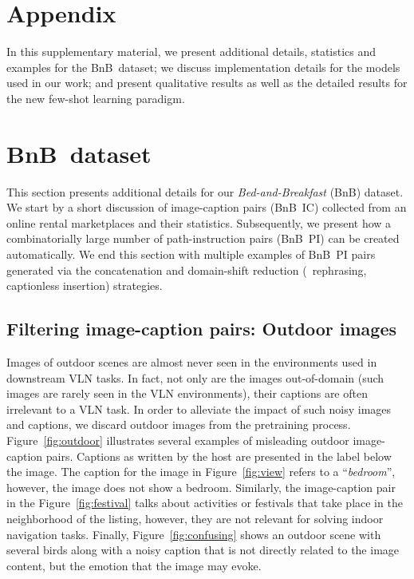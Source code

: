 \RequirePackage[dvipsnames,table]{xcolor} \documentclass[10pt,twocolumn,letterpaper]{article}
\newcommand{\airbnb}{BnB}
\begin{document}
\newpage
\appendix
\section*{Appendix}
In this supplementary material, we present additional details, statistics and examples for the \airbnb~dataset; we discuss implementation details for the models used in our work; and present qualitative results as well as the detailed results for the new few-shot learning paradigm.


\section{\airbnb~dataset}
\label{sec:supp-bnb}

This section presents additional details for our \emph{Bed-and-Breakfast} (BnB) dataset.
We start by a short discussion of image-caption pairs (\airbnb~IC) collected from an online rental marketplaces and their statistics.
Subsequently, we present how a combinatorially large number of path-instruction pairs (\airbnb~PI) can be created automatically.
We end this section with multiple examples of \airbnb~PI pairs generated via the concatenation and domain-shift reduction (\eg~rephrasing, captionless insertion) strategies.

\subsection{Filtering image-caption pairs: Outdoor images}
Images of outdoor scenes are almost never seen in the environments used in downstream VLN tasks.
In fact, not only are the images out-of-domain (such images are rarely seen in the VLN environments), their captions are often irrelevant to a VLN task.
In order to alleviate the impact of such noisy images and captions, we discard outdoor images from the pretraining process.
Figure~\ref{fig:outdoor} illustrates several examples of misleading outdoor image-caption pairs.
Captions as written by the host are presented in the label below the image.
The caption for the image in Figure~\ref{fig:view} refers to a ``\emph{bedroom}'', however, the image does not show a bedroom.
Similarly, the image-caption pair in the Figure~\ref{fig:festival} talks about activities or festivals that take place in the neighborhood of the listing, however, they are not relevant for solving indoor navigation tasks.
Finally, Figure~\ref{fig:confusing} shows an outdoor scene with several birds along with a noisy caption that is not directly related to the image content, but the emotion that the image may evoke.
\end{document}
